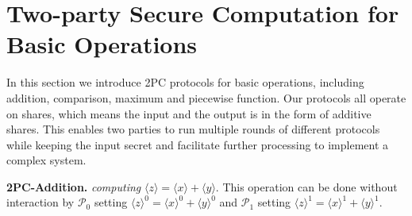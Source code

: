 \documentclass[letterpaper]{article} %
\begin{document}
\section{Two-party Secure Computation for Basic Operations}

    In this section we introduce 2PC protocols for basic operations,
    including addition, comparison, maximum and piecewise function.
    Our protocols all operate on shares, which means
    the input and the output is in the form of additive shares.
    This enables two parties to run multiple rounds of different
    protocols while keeping the input secret
    and facilitate further processing to implement a complex system.



    \textbf{2PC-Addition.}
    \emph{computing}
    $ \langle z\rangle  = \langle x\rangle  + \langle y\rangle $. This operation can be done without interaction by
    $\mathcal{P}_{0}$ setting $\langle z\rangle^{0}  = \langle x\rangle^{0}  + \langle y\rangle^{0} $ and
    $\mathcal{P}_{1}$ setting $\langle z\rangle^{1}  = \langle x\rangle^{1}  + \langle y\rangle^{1} $.



\end{document}
